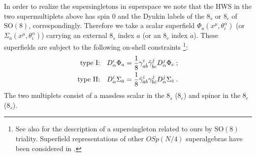\documentclass[a4paper,12pt]{article}
\begin{document}
In order to realize the supersingletons in superspace we note that 
the HWS in the two supermultiplets above has spin 0 and the Dynkin 
labels of the $8_s$ or $8_c$ of $\mbox{SO}(8)$, correspondingly. 
Therefore we take a scalar superfield $\Phi_a(x^\mu, 
\theta^\alpha_i)$ (or $\Sigma_{\dot a}(x^\mu, \theta^\alpha_i)$) 
carrying an external $8_s$ index $a$ (or an $8_c$ index $\dot a$). 
These superfields are subject to the following on-shell 
constraints \footnote{See also \cite{Howe} for the description of 
a supersingleton related to ours by $\mbox{SO}(8)$ triality. 
Superfield representations of other $OSp(N/4)$ superalgebras have 
been considered in \cite{IS,FFre}.}: 
\begin{eqnarray}
  \mbox{type I:}&&D^i_\alpha\Phi_a = {1\over 8}\gamma^i_{a\dot 
b}\tilde\gamma^j_{\dot b c} D^j_\alpha\Phi_c\;; \label{7.25}\\ 
  \mbox{type II:}&& D^i_\alpha\Sigma_{\dot a} = {1\over 
8}\tilde\gamma^i_{\dot a b}\gamma^j_{b\dot c} 
D^j_\alpha\Sigma_{\dot c}\;. \label{7.26} 
\end{eqnarray}
The two multiplets consist of a massless scalar in the $8_s$ 
($8_c$) and spinor in the $8_c$ ($8_s$). 
\end{document}
